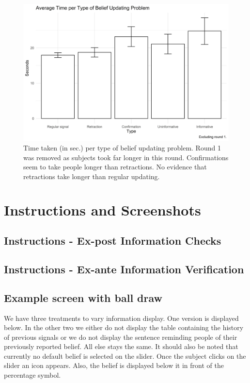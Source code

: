 \documentclass{article}
\begin{document}
\begin{figure}[!htb]
    \centering
    \includegraphics[width=12cm]{Fig/02_fig_time_belief_type.jpg}
    \caption{Time taken (in sec.) per type of belief updating problem. Round 1 was removed as subjects took far longer in this round. Confirmations seem to take people longer than retractions. No evidence that retractions take longer than regular updating.}
\end{figure}



\newpage
\section{Instructions and Screenshots}
\label{sec:instructions}

\subsection{Instructions - Ex-post Information Checks}


\subsection{Instructions - Ex-ante Information Verification}




\subsection{Example screen with ball draw}

We have three treatments to vary information display. One version is displayed below. In the other two we either do not display the table containing the history of previous signals or we do not display the sentence reminding people of their previously reported belief. All else stays the same. It should also be noted that currently no default belief is selected on the slider. Once the subject clicks on the slider an icon appears. Also, the belief is displayed below it in front of the percentage symbol.
\end{document}
